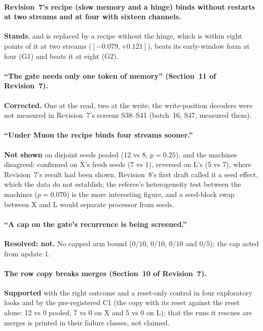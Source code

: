 \documentclass[11pt]{article}
\begin{document}
\paragraph{Revision~7's recipe (slow memory and a hinge) binds without restarts at two streams and at four with sixteen channels.} \textbf{Stands}, and is replaced by a recipe without the hinge, which is within eight points of it at two streams ($[-0.079, +0.121]$), beats its early-window form at four (G1) and beats it at eight (G2).

\paragraph{``The gate needs only one token of memory'' (Section~11 of Revision~7).} \textbf{Corrected.} One at the read, two at the write; the write-position decoders were not measured in Revision~7's screens S38--S41 (batch~16, S47, measured them).

\paragraph{``Under Muon the recipe binds four streams sooner.''} \textbf{Not shown} on disjoint seeds pooled (12 vs 8, $p = 0.25$), and the machines disagreed: confirmed on X's fresh seeds (7 vs 1), reversed on L's (5 vs 7), where Revision~7's result had been shown. Revision~8's first draft called it a seed effect, which the data do not establish; the referee's heterogeneity test between the machines ($p = 0.070$) is the more interesting figure, and a seed-block swap between X and L would separate processor from seeds.

\paragraph{``A cap on the gate's recurrence is being screened.''} \textbf{Resolved: not.} No capped arm bound ($0/10$, $0/10$, $0/10$ and $0/5$); the cap acted from update 1.

\paragraph{The row copy breaks merges (Section~10 of Revision~7).} \textbf{Supported} with the right outcome and a reset-only control in four exploratory looks and by the pre-registered C1 (the copy with its reset against the reset alone: 12 vs 0 pooled, 7 vs 0 on X and 5 vs 0 on L); that the runs it rescues are merges is printed in their failure classes, not claimed.
\end{document}

